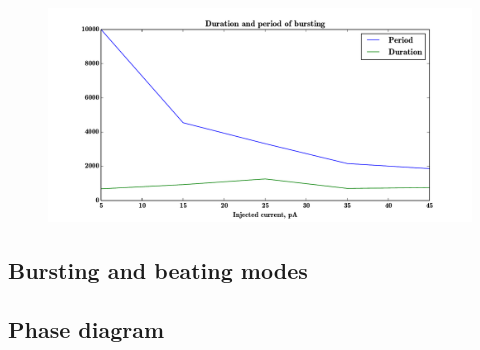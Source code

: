 \documentclass[a4paper,11pt]{article} %
\begin{document}
\begin{figure}[H]
    \centering
    \includegraphics{bduration_bperiod}
    \caption{}
    \label{fig:bdur_bper}
\end{figure}

\subsection{Bursting and beating modes}
\subsection{Phase diagram}
\end{document}

